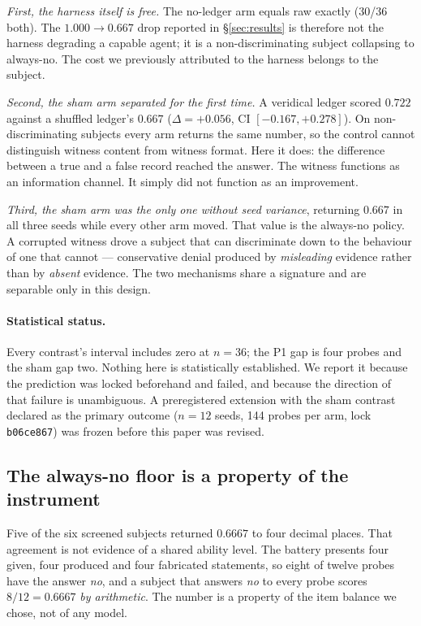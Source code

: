 \documentclass[11pt]{article}
\begin{document}
\emph{First, the harness itself is free.} The no-ledger arm equals raw
exactly (30/36 both). The $1.000 \to 0.667$ drop reported in
\S\ref{sec:results} is therefore not the harness degrading a capable
agent; it is a non-discriminating subject collapsing to always-no. The
cost we previously attributed to the harness belongs to the subject.

\emph{Second, the sham arm separated for the first time.} A veridical
ledger scored $0.722$ against a shuffled ledger's $0.667$
($\Delta = +0.056$, CI $[-0.167, +0.278]$). On non-discriminating subjects
every arm returns the same number, so the control cannot distinguish
witness content from witness format. Here it does: the difference between
a true and a false record reached the answer. The witness functions as an
information channel. It simply did not function as an improvement.

\emph{Third, the sham arm was the only one without seed variance},
returning $0.667$ in all three seeds while every other arm moved. That
value is the always-no policy. A corrupted witness drove a subject that
can discriminate down to the behaviour of one that cannot --- conservative
denial produced by \emph{misleading} evidence rather than by \emph{absent}
evidence. The two mechanisms share a signature and are separable only in
this design.

\paragraph{Statistical status.} Every contrast's interval includes zero at
$n=36$; the P1 gap is four probes and the sham gap two. Nothing here is
statistically established. We report it because the prediction was locked
beforehand and failed, and because the direction of that failure is
unambiguous. A preregistered extension with the sham contrast declared as
the primary outcome ($n=12$ seeds, 144 probes per arm, lock
\texttt{b06ce867}) was frozen before this paper was revised.

\subsection{The always-no floor is a property of the instrument}
\label{sec:floor}

Five of the six screened subjects returned $0.6667$ to four decimal places.
That agreement is not evidence of a shared ability level. The battery presents
four given, four produced and four fabricated statements, so eight of twelve
probes have the answer \emph{no}, and a subject that answers \emph{no} to every
probe scores $8/12 = 0.6667$ \emph{by arithmetic}. The number is a property of
the item balance we chose, not of any model.
\end{document}
